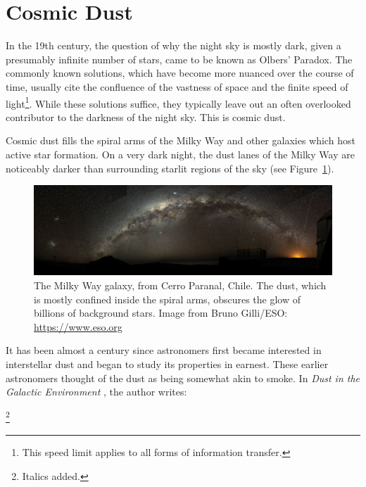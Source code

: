 \section{Cosmic Dust}

In the 19th century, the question of why the night sky is mostly dark, given a presumably infinite number of stars, came to be known as Olbers' Paradox. The commonly known solutions, which have become more nuanced over the course of time, usually cite the confluence of the vastness of space and the finite speed of light\footnote{This speed limit applies to all forms of information transfer.}. While these solutions suffice, they typically leave out an often overlooked contributor to the darkness of the night sky. This is cosmic dust.

Cosmic dust fills the spiral arms of the Milky Way and other galaxies which host active star formation. On a very dark night, the dust lanes of the Milky Way are noticeably darker than surrounding starlit regions of the sky (see Figure~\ref{fig:MW}).

\begin{figure}[!htbp]
\centering
\includegraphics[width=\textwidth]{figures/intro/Milky_Way_Arch}
\caption[~The dust lane of the Milky Way galaxy.]{The Milky Way galaxy, from Cerro Paranal, Chile. The dust, which is mostly confined inside the spiral arms, obscures the glow of billions of background stars. Image from Bruno Gilli/ESO: \url{https://www.eso.org}}
\label{fig:MW}
\end{figure}

It has been almost a century since astronomers first became interested in interstellar dust and began to study its properties in earnest. These earlier astronomers thought of the dust as being somewhat akin to smoke. In \textit{Dust in the Galactic Environment} \citep{whittet2002dust}, the author writes:

\footnote{Italics added.}


